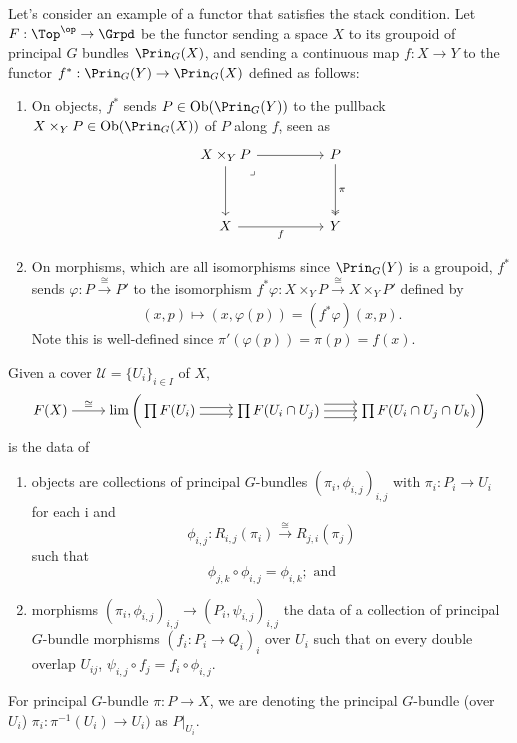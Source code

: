 \begin{example}
Let's consider an example of a functor that satisfies the stack condition. Let $F: \Top^{\op} \to \Grpd$ be the functor sending a space $X$ to its groupoid of principal $G$ bundles $\Prin_{G}(X)$, and sending a continuous map $f: X \to Y$ to the functor $f^*: \Prin_{G}(Y) \to \Prin_{G}(X)$ defined as follows:
\begin{enumerate}
    \item On objects, $f^*$ sends $P \in \text{Ob}(\Prin_{G}(Y))$ to the pullback $X \times_{Y} P \in \text{Ob}(\Prin_{G}(X))$ of $P$ along $f$, seen as
    \[\begin{tikzcd}
    	{X \times_{Y} P} && P \\
    	\\
    	X && Y
    	\arrow[from=1-1, to=1-3]
    	\arrow[from=1-1, to=3-1]
    	\arrow["\lrcorner"{anchor=center, pos=0.125}, draw=none, from=1-1, to=3-3]
    	\arrow["\pi", two heads, from=1-3, to=3-3]
    	\arrow["f"', from=3-1, to=3-3]
    \end{tikzcd}\]
    \item On morphisms, which are all isomorphisms since $\Prin_{G}(Y)$ is a groupoid, $f^*$ sends $\varphi: P \xrightarrow[]{\cong} P'$ to the isomorphism $f^*\varphi : X \times_{Y} P \xrightarrow[]{\cong} X \times_{Y} P'$ defined by
    $$
    (x, p) \mapsto (x, \varphi(p)) = (f^*\varphi)(x,p).
    $$
    Note this is well-defined since \( \pi'(\varphi(p)) = \pi(p) = f(x). \)
\end{enumerate}

Given a cover \( \mathcal{U} = \{ U_i \}_{i \in I } \) of \( X \),
\[\begin{tikzcd}[cramped]
	{F(X)} & {\lim \bigg( \prod F(U_i)} & {\prod F(U_i \cap U_j)} & {\prod F(U_i \cap U_j \cap U_k) \bigg)}
	\arrow["\cong", from=1-1, to=1-2]
	\arrow[shift right, from=1-2, to=1-3]
	\arrow[shift left, from=1-2, to=1-3]
	\arrow[from=1-3, to=1-4]
	\arrow[shift left=2, from=1-3, to=1-4]
	\arrow[shift right=2, from=1-3, to=1-4]
\end{tikzcd}\]
is the data of
\begin{enumerate}
    \item objects are collections of principal \( G \)-bundles \( (\pi_i,\phi_{i,j})_{i,j} \) with \( \pi_i: P_i \to U_i \) for each i and
    \[ \phi_{i,j} : R_{i,j}(\pi_i) \xrightarrow{\cong} R_{j,i}(\pi_j) \]
    such that
    \[ \phi_{j,k} \circ \phi_{i,j} = \phi_{i,k}; \text{ and} \]
    \item morphisms \( (\pi_i,\phi_{i,j})_{i,j} \to (P_i,\psi_{i,j})_{i,j} \) the data of a collection of principal \( G \)-bundle morphisms \( (f_i: P_i \to Q_i)_i \) over \( U_i \) such that on every double overlap \( U_{ij} \), \( \psi_{i,j} \circ f_j = f_i \circ \phi_{i,j} \).
\end{enumerate}
For principal \( G \)-bundle \( \pi: P \to X \), we are denoting the principal \( G \)-bundle (over \( U_i \)) \( \pi_{i}: \pi^{-1}(U_i) \to U_i) \) as \( P|_{U_i} \).


\end{example}
